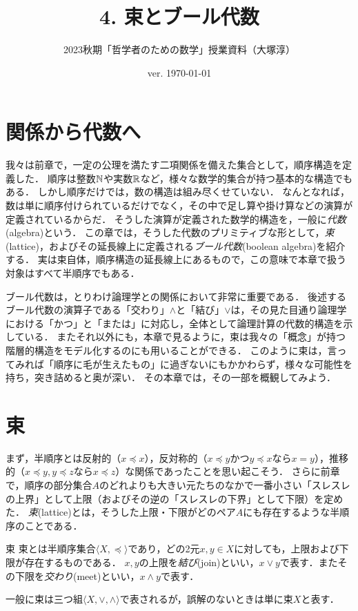 \documentclass[11pt,a4paper, dvipdfmx]{jsarticle}
\begin{document}
\title{4. 束とブール代数}
\author{2023秋期「哲学者のための数学」授業資料（大塚淳）}
\date{ver. \today}
\maketitle

\section{関係から代数へ}
我々は前章で，一定の公理を満たす二項関係を備えた集合として，順序構造を定義した．
順序は整数$\mathbb{N}$や実数$\mathbb{R}$など，様々な数学的集合が持つ基本的な構造でもある．
しかし順序だけでは，数の構造は組み尽くせていない．
なんとなれば，数は単に順序付けられているだけでなく，その中で足し算や掛け算などの演算が定義されているからだ．
そうした演算が定義された数学的構造を，一般に\emph{代数}(algebra)という．
この章では，そうした代数のプリミティブな形として，\emph{束}(lattice)，およびその延長線上に定義される\emph{ブール代数}(boolean algebra)を紹介する．
実は束自体，順序構造の延長線上にあるもので，この意味で本章で扱う対象はすべて半順序でもある．

ブール代数は，とりわけ論理学との関係において非常に重要である．
後述するブール代数の演算子である「交わり」$\wedge$と「結び」$\vee$は，その見た目通り論理学における「かつ」と「または」に対応し，全体として論理計算の代数的構造を示している．
またそれ以外にも，本章で見るように，束は我々の「概念」が持つ階層的構造をモデル化するのにも用いることができる．
このように束は，言ってみれば「順序に毛が生えたもの」に過ぎないにもかかわらず，様々な可能性を持ち，突き詰めると奥が深い．
その本章では，その一部を概観してみよう．

\section{束}

まず，半順序とは反射的（$x \preceq x$），反対称的（$x \preceq y$かつ$y \preceq x$なら$x=y$），推移的（$x \preceq y, y \preceq z$なら$x \preceq z$）な関係であったことを思い起こそう．
さらに前章で，順序の部分集合$A$のどれよりも大きい元たちのなかで一番小さい「スレスレの上界」として上限（およびその逆の「スレスレの下界」として下限）を定めた．
\emph{束}(lattice)とは，そうした上限・下限がどのペア$A$にも存在するような半順序のことである．

\begin{itembox}[l]{束}
束とは半順序集合$\langle X, \preceq \rangle$であり，どの2元$x, y \in X$に対しても，上限および下限が存在するものである．
$x, y$の上限を\emph{結び}(join)といい，$x \vee y$で表す．またその下限を\emph{交わり}(meet)といい，$x \wedge y$で表す．

一般に束は三つ組$\langle X, \vee, \wedge \rangle$で表されるが，誤解のないときは単に束$X$と表す．
\end{itembox}
\end{document}

